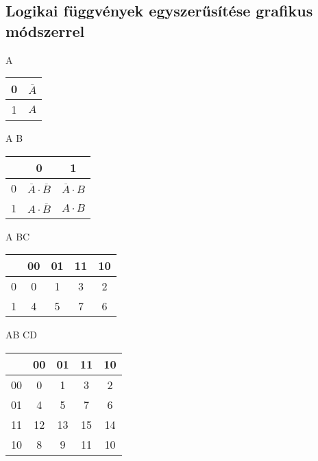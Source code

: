 \documentclass{article}
\begin{document}
\subsection{Logikai függvények egyszerűsítése grafikus módszerrel}
A
\begin{table}[ht]
    \begin{tabular}{c|c|}
        0          & \(\overline{A}\) \\
        \hline
        1          & \(A\)            \\
    \end{tabular}
\end{table}
\newpage
A B
\begin{table}[ht]
    \begin{tabular}{c|c|c|}
        & 0          & 1          \\
        \hline
        0          & \(\overline{A} \cdot \overline{B}\) & \(\overline{A} \cdot B\) \\
        \hline
        1          & \(A \cdot \overline{B}\)            & \(A \cdot B\)            \\
    \end{tabular}
\end{table}
\newline
A BC
\begin{table}[ht]
    \begin{tabular}{c|c|c|c|c|}
        & 00         & 01         & 11         & 10         \\
        \hline
        0          & 0          & 1          & 3         & 2          \\
        \hline
        1          & 4          & 5          & 7         & 6          \\
    \end{tabular}
\end{table}
\newline
AB CD
\begin{table}[ht]
    \begin{tabular}{c|c|c|c|c|}
        & 00         & 01         & 11         & 10         \\
        \hline
        00         & 0          & 1          & 3         & 2          \\
        \hline
        01         & 4          & 5          & 7         & 6          \\
        \hline
        11         & 12         & 13         & 15        & 14         \\
        \hline
        10         & 8          & 9          & 11        & 10         \\
    \end{tabular}
\end{table}
\end{document}
